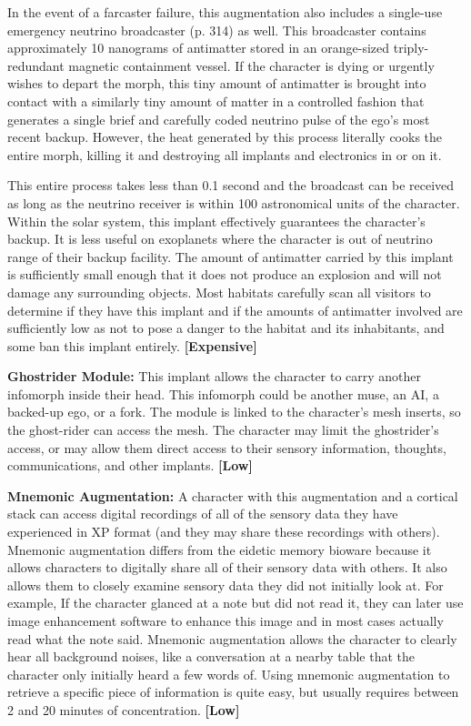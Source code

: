 In the event of a farcaster failure, this augmentation also includes a single-use emergency neutrino broadcaster (p. 314) as well. This broadcaster contains approximately 10 nanograms of antimatter stored in an orange-sized triply-redundant magnetic containment vessel. If the character is dying or urgently wishes to depart the morph, this tiny amount of antimatter is brought into contact with a similarly tiny amount of matter in a controlled fashion that generates a single brief and carefully coded neutrino pulse of the ego’s most recent backup. However, the heat generated by this process literally cooks the entire morph, killing it and destroying all implants and electronics in or on it. 

This entire process takes less than 0.1 second and the broadcast can be received as long as the neutrino receiver is within 100 astronomical units of the character. Within the solar system, this implant effectively guarantees the character’s backup. It is less useful on exoplanets where the character is out of neutrino range of their backup facility. The amount of antimatter carried by this implant is sufficiently small enough that it does not produce an explosion and will not damage any surrounding objects. Most habitats carefully scan all visitors to determine if they have this implant and if the amounts of antimatter involved are sufficiently low as not to pose a danger to the habitat and its inhabitants, and some ban this implant entirely. \textbf{[Expensive]} 

\textbf{Ghostrider Module:} This implant allows the character to carry another infomorph inside their head. This infomorph could be another muse, an AI, a backed-up ego, or a fork. The module is linked to the character’s mesh inserts, so the ghost-rider can access the mesh. The character may limit the ghostrider’s access, or may allow them direct access to their sensory information, thoughts, communications, and other implants. \textbf{[Low]} 

\textbf{Mnemonic Augmentation:} A character with this augmentation and a cortical stack can access digital recordings of all of the sensory data they have experienced in XP format (and they may share these recordings with others). Mnemonic augmentation differs from the eidetic memory bioware because it allows characters to digitally share all of their sensory data with others. It also allows them to closely examine sensory data they did not initially look at. For example, If the character glanced at a note but did not read it, they can later use image enhancement software to enhance this image and in most cases actually read what the note said. Mnemonic augmentation allows the character to clearly hear all background noises, like a conversation at a nearby table that the character only initially heard a few words of. Using mnemonic augmentation to retrieve a specific piece of information is quite easy, but usually requires between 2 and 20 minutes of concentration. \textbf{[Low]} 

